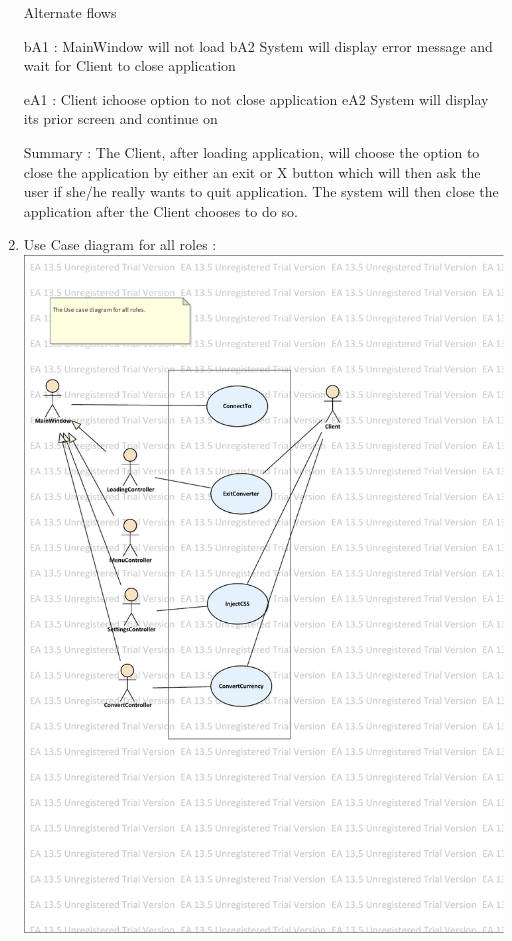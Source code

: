 \documentclass[12pt]{article}
\begin{document}
\begin{enumerate}
Alternate flows

bA1 : MainWindow will not load
\newline bA2 System will display error message and wait for Client to close application

eA1 : Client ichoose option to not close application
\newline eA2 System will display its prior screen and continue on

Summary : The Client, after loading application, will choose the option to close the application by either an exit or X button which will then ask the user if she/he really wants to quit application. The system will then close the application after the Client chooses to do so.



\item   Use Case diagram for all roles : 
\newpage
\includegraphics[scale=0.8]{useCase.pdf}
\newpage


\end{enumerate}
\end{document}
